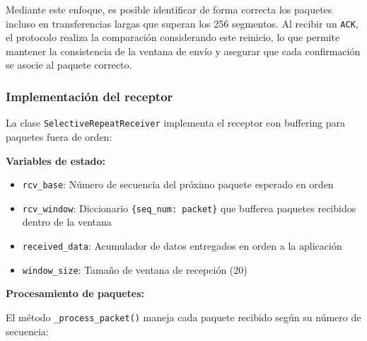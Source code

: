 Mediante este enfoque, es posible identificar de forma correcta los paquetes incluso en transferencias largas que superan los 256 segmentos. Al recibir un \texttt{ACK}, el protocolo realiza la comparación considerando este reinicio, lo que permite mantener la consistencia de la ventana de envío y asegurar que cada confirmación se asocie al paquete correcto.

\subsubsection{Implementación del receptor}

La clase \texttt{SelectiveRepeatReceiver} implementa el receptor con buffering para paquetes fuera de orden:

\textbf{Variables de estado:}
\begin{itemize}
    \item \texttt{rcv\_base}: Número de secuencia del próximo paquete esperado en orden
    \item \texttt{rcv\_window}: Diccionario \texttt{\{seq\_num: packet\}} que bufferea paquetes recibidos dentro de la ventana
    \item \texttt{received\_data}: Acumulador de datos entregados en orden a la aplicación
    \item \texttt{window\_size}: Tamaño de ventana de recepción (20)
\end{itemize}

\textbf{Procesamiento de paquetes:}

El método \texttt{\_process\_packet()} maneja cada paquete recibido según su número de secuencia:

